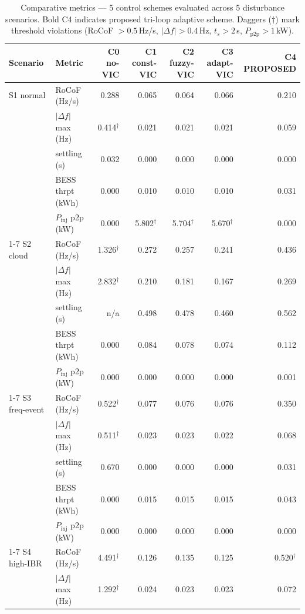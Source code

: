 \begin{table}[t]
\centering
\caption{Comparative metrics — 5 control schemes evaluated across 5 disturbance scenarios. Bold C4 indicates proposed tri-loop adaptive scheme. Daggers ($\dagger$) mark threshold violations (RoCoF $>0.5$\,Hz/s, $|\Delta f| > 0.4$\,Hz, $t_s > 2$\,s, $P_\mathrm{p2p} > 1$\,kW).}
\label{tab:comparative}
\begin{tabular}{llrrrrr}
\toprule
Scenario & Metric & C0 no-VIC & C1 const-VIC & C2 fuzzy-VIC & C3 adapt-VIC & \textbf{C4 PROPOSED} \\
\midrule
  S1 normal & RoCoF (Hz/s) & 0.288 & 0.065 & 0.064 & 0.066 & 0.210 \\
   & $|\Delta f|$ max (Hz) & 0.414$^\dagger$ & 0.021 & 0.021 & 0.021 & 0.059 \\
   & settling (s) & 0.032 & 0.000 & 0.000 & 0.000 & 0.000 \\
   & BESS thrpt (kWh) & 0.000 & 0.010 & 0.010 & 0.010 & 0.031 \\
   & $P_\mathrm{inj}$ p2p (kW) & 0.000 & 5.802$^\dagger$ & 5.704$^\dagger$ & 5.670$^\dagger$ & 0.000 \\
  \cmidrule(lr){1-7}
  S2 cloud & RoCoF (Hz/s) & 1.326$^\dagger$ & 0.272 & 0.257 & 0.241 & 0.436 \\
   & $|\Delta f|$ max (Hz) & 2.832$^\dagger$ & 0.210 & 0.181 & 0.167 & 0.269 \\
   & settling (s) & n/a & 0.498 & 0.478 & 0.460 & 0.562 \\
   & BESS thrpt (kWh) & 0.000 & 0.084 & 0.078 & 0.074 & 0.112 \\
   & $P_\mathrm{inj}$ p2p (kW) & 0.000 & 0.000 & 0.000 & 0.000 & 0.001 \\
  \cmidrule(lr){1-7}
  S3 freq-event & RoCoF (Hz/s) & 0.522$^\dagger$ & 0.077 & 0.076 & 0.076 & 0.350 \\
   & $|\Delta f|$ max (Hz) & 0.511$^\dagger$ & 0.023 & 0.023 & 0.022 & 0.068 \\
   & settling (s) & 0.670 & 0.000 & 0.000 & 0.000 & 0.031 \\
   & BESS thrpt (kWh) & 0.000 & 0.015 & 0.015 & 0.015 & 0.043 \\
   & $P_\mathrm{inj}$ p2p (kW) & 0.000 & 0.000 & 0.000 & 0.000 & 0.000 \\
  \cmidrule(lr){1-7}
  S4 high-IBR & RoCoF (Hz/s) & 4.491$^\dagger$ & 0.126 & 0.135 & 0.125 & 0.520$^\dagger$ \\
   & $|\Delta f|$ max (Hz) & 1.292$^\dagger$ & 0.024 & 0.023 & 0.023 & 0.072 \\

\end{tabular}
\end{table}
